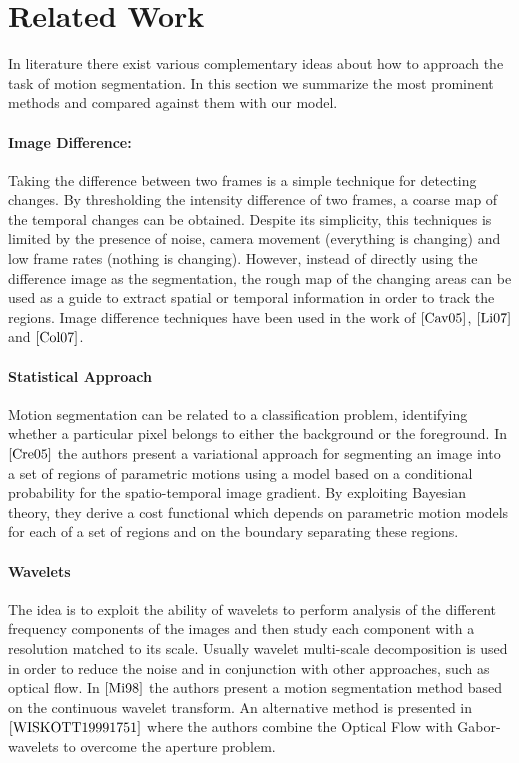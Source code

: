 \section{Related Work}
In literature there exist various complementary ideas about how to approach the task of motion segmentation. In this section we summarize the most prominent methods  and compared against them with our model.

\paragraph{Image Difference:} Taking the difference between two frames is a simple technique for detecting changes. By thresholding the intensity difference of two frames, a coarse map of the temporal changes can be obtained. Despite its simplicity, this techniques is limited by the presence of noise, camera movement (everything is changing) and low frame rates (nothing is changing). However, instead of directly using the difference image as the segmentation, the rough map of the changing areas can be used as a guide to extract spatial or temporal information in order to track the regions. Image difference techniques have been used in the work of $\cite{Cav05}$, $\cite{Li07}$ and $\cite{Col07}$.

\paragraph{Statistical Approach} Motion segmentation can be related to a classification problem, identifying whether a particular pixel belongs to either the background or the foreground. In $\cite{Cre05}$ the authors present a variational approach for segmenting an image into a set of regions of parametric motions using a model based on a conditional probability for the spatio-temporal image gradient. By exploiting Bayesian theory, they derive a cost functional which depends on parametric motion models for each  of a set of regions and on the boundary separating these regions.

\paragraph{Wavelets}
The idea is to exploit the ability of wavelets to perform analysis of the different frequency components of the images and then study each component with a resolution matched to its scale. Usually wavelet multi-scale decomposition is used in order to reduce the noise and in conjunction with other approaches, such as optical flow. In $\cite{Mi98}$ the authors present a motion segmentation method based on the continuous wavelet transform. An alternative method is presented in $\cite{WISKOTT19991751}$ where the authors combine the Optical Flow with Gabor-wavelets to overcome the aperture problem. 

